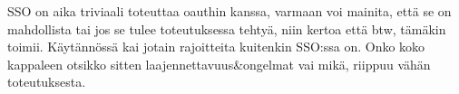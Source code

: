 SSO on aika triviaali toteuttaa oauthin kanssa, varmaan voi mainita, että se on mahdollista tai jos se tulee toteutuksessa tehtyä, niin kertoa että btw, tämäkin toimii. Käytännössä kai jotain rajoitteita kuitenkin SSO:ssa on. Onko koko kappaleen otsikko sitten laajennettavuus\&ongelmat vai mikä, riippuu vähän toteutuksesta.